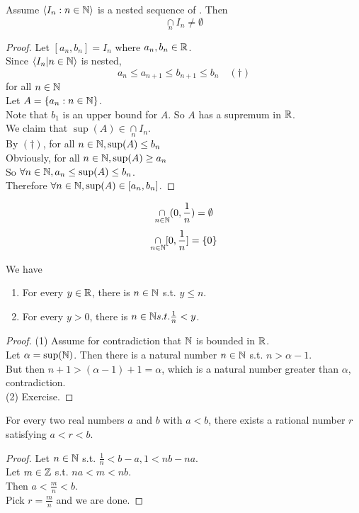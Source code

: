 \documentclass[11pt]{article}
\begin{document}
Assume $\langle I_n: n \in \mathbb{N}\rangle$ is a nested sequence of . Then $$\underset{n}{\cap} I_n \neq \emptyset$$
\begin{proof}
Let $[a_n, b_n] = I_n$ where $a_n, b_n \in \mathbb{R}$. \\
Since $\langle I_n | n \in \mathbb{N} \rangle$ is nested,
$$a_n \leq a_{n+1} \leq b_{n+1} \leq b_n \quad (\dagger)$$ for all $n \in \mathbb{N}$\\
Let $A = \{ a_n: n \in \mathbb{N} \}$.\\
Note that $b_1$ is an upper bound for $A$. So $A$ has a supremum in $\mathbb{R}$. \\
We claim that $\sup(A) \in \underset{n}{\cap} I_n$.\\
By $(\dagger)$, for all $n \in \mathbb{N}, \sup(A) \leq b_n$\\
Obviously, for all $n \in \mathbb{N}, \sup(A) \geq a_n$\\
So $\forall n \in \mathbb{N}, a_n \leq \sup(A) \leq b_n$. \\
Therefore $\forall n \in \mathbb{N}, \sup(A) \in [a_n, b_n]$. 
\end{proof}

\example
$$\underset{n \in \mathbb{N}}{\cap} (0, \frac{1}{n}) = \emptyset$$
$$\underset{n \in \mathbb{N}}{\cap} [0, \frac{1}{n}] = \{0\}$$

We have
\begin{enumerate}
	\item For every $y \in \mathbb{R}$, there is $n \in \mathbb{N}$ s.t. $y \leq n$.
	\item For every $y > 0$, there is $n \in \mathbb{N} s.t. \frac{1}{n} < y$.
\end{enumerate}
\begin{proof}
	(1) Assume for contradiction that $\mathbb{N}$ is bounded in $\mathbb{R}$. \\
	Let $\alpha = \sup(\mathbb{N})$. Then there is a natural number $n \in \mathbb{N}$ s.t. $n > \alpha - 1$. \\
	But then $n + 1 > (\alpha - 1) + 1 = \alpha$, which is a natural number greater than $\alpha$, contradiction. \\
	(2) Exercise.
\end{proof}

For every two real numbers $a$ and $b$ with $a < b$, there exists a rational number $r$ satisfying $a < r < b$.
\begin{proof}
Let $n \in \mathbb{N}$ s.t. $\frac{1}{n} < b - a, 1 < nb - na$. \\
Let $m \in \mathbb{Z}$ s.t. $na < m < nb$. \\
Then $a < \frac{m}{n} < b$. \\
Pick $r = \frac{m}{n}$ and we are done.
\end{proof}
\end{document}

